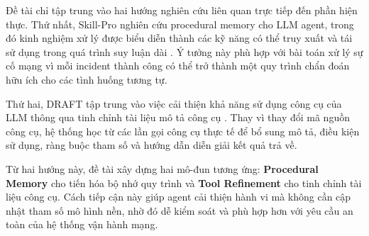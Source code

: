 Đề tài chỉ tập trung vào hai hướng nghiên cứu liên quan trực tiếp đến phần hiện thực. Thứ nhất, Skill-Pro nghiên cứu procedural memory cho LLM agent, trong đó kinh nghiệm xử lý được biểu diễn thành các kỹ năng có thể truy xuất và tái sử dụng trong quá trình suy luận dài \cite{skillpro2024}. Ý tưởng này phù hợp với bài toán xử lý sự cố mạng vì mỗi incident thành công có thể trở thành một quy trình chẩn đoán hữu ích cho các tình huống tương tự.

Thứ hai, DRAFT tập trung vào việc cải thiện khả năng sử dụng công cụ của LLM thông qua tinh chỉnh tài liệu mô tả công cụ \cite{draft2024}. Thay vì thay đổi mã nguồn công cụ, hệ thống học từ các lần gọi công cụ thực tế để bổ sung mô tả, điều kiện sử dụng, ràng buộc tham số và hướng dẫn diễn giải kết quả trả về.

Từ hai hướng này, đề tài xây dựng hai mô-đun tương ứng: \textbf{Procedural Memory} cho tiến hóa bộ nhớ quy trình và \textbf{Tool Refinement} cho tinh chỉnh tài liệu công cụ. Cách tiếp cận này giúp agent cải thiện hành vi mà không cần cập nhật tham số mô hình nền, nhờ đó dễ kiểm soát và phù hợp hơn với yêu cầu an toàn của hệ thống vận hành mạng.
